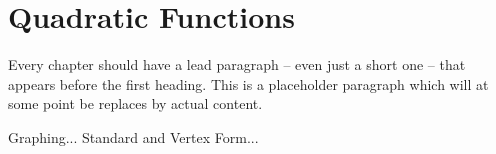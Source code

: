 \chapter{Quadratic Functions}
\label{ch:quadfunc}



Every chapter should have a lead paragraph -- even just a short one -- that appears before the first heading. This is a placeholder paragraph which will at some point be replaces by actual content.

Graphing... Standard and Vertex Form...

